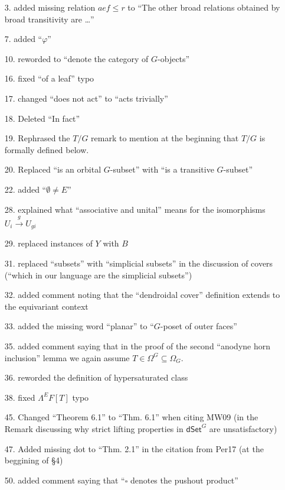 \documentclass{article}
\begin{document}
\begin{itemize}
\item[3.] added missing relation $aef \leq r$ to ``The other broad relations obtained by broad transitivity are \dots''
\item[7.] added ``$\varphi$''
\item[10.] reworded to ``denote the category of $G$-objects''
\item[16.] fixed ``of a leaf'' typo
\item[17.] changed ``does not act'' to ``acts trivially''
\item[18.] Deleted ``In fact''
\item[19.] Rephrased the $T/G$ remark to mention at the beginning that $T/G$ is formally defined below.
\item[20.] Replaced ``is an orbital $G$-subset'' with ``is a transitive $G$-subset''
\item[22.] added ``$\emptyset \neq E$''
\item[28.] explained what ``associative and unital'' means for the isomorphisms $U_i \xrightarrow{g} U_{gi}$
\item[29.] replaced instances of $Y$ with $B$
\item[31.] replaced ``subsets'' with ``simplicial subsets'' in the discussion of covers (``which in our language are the simplicial subsets'')
\item[32.] added comment noting that the ``dendroidal cover'' definition extends to the equivariant context
\item[33.] added the missing word ``planar'' to ``$G$-poset of outer faces''
\item[35.] added comment saying that in the proof of the second ``anodyne horn inclusion'' lemma we again assume $T \in \Omega^G \subseteq \Omega_G$.
\item[36.] reworded the definition of hypersaturated class
\item[38.] fixed $\Lambda^EF[T]$ typo
\item[45.] Changed ``Theorem 6.1'' to ``Thm. 6.1'' when citing MW09 (in the Remark discussing why strict lifting properties in $\mathsf{dSet}^G$ are unsatisfactory)
\item[47.] Added missing dot to ``Thm. 2.1'' in the citation from Per17 (at the beggining of \S 4)
\item[50.] added comment saying that ``$\square$ denotes the pushout product''

\end{itemize}
\end{document}
